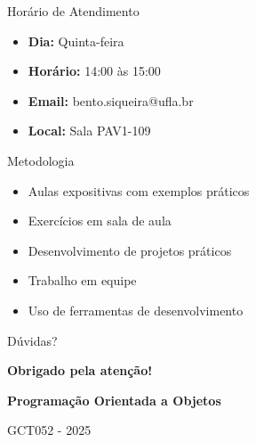 \documentclass[aspectratio=169]{beamer}
\begin{document}
\begin{frame}{Horário de Atendimento}
\begin{itemize}
    \item \textbf{Dia:} Quinta-feira
    \item \textbf{Horário:} 14:00 às 15:00
    \item \textbf{Email:} bento.siqueira@ufla.br
    \item \textbf{Local:} Sala PAV1-109
\end{itemize}
\end{frame}

\begin{frame}{Metodologia}
\begin{itemize}
    \item Aulas expositivas com exemplos práticos
    \item Exercícios em sala de aula
    \item Desenvolvimento de projetos práticos
    \item Trabalho em equipe
    \item Uso de ferramentas de desenvolvimento
\end{itemize}
\end{frame}

\begin{frame}{Dúvidas?}
\begin{center}
\Large
\textbf{Obrigado pela atenção!}

\vspace{1cm}
\textbf{Programação Orientada a Objetos}

\vspace{0.5cm}
GCT052 - 2025
\end{center}
\end{frame}
\end{document}
